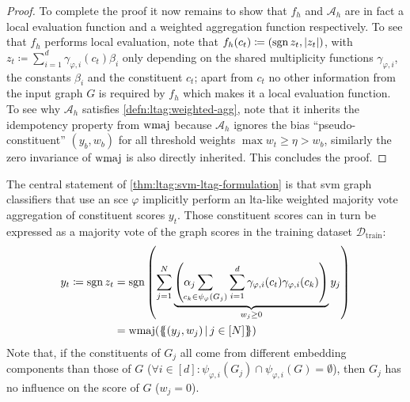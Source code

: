 \begin{proof}
	To complete the proof it now remains to show that $f_h$ and $\mathcal{A}_h$ are in fact a local evaluation function and a weighted aggregation function respectively.
	To see that $f_h$ performs local evaluation, note that $f_h(c_t) \coloneqq (\operatorname{sgn} z_t, {|z_t|})$, with $z_t \coloneqq \sum_{i=1}^{d} \gamma_{\varphi,i}(c_t) \beta_i$ only depending on the shared multiplicity functions $\gamma_{\varphi,i}$, the constants $\beta_i$ and the constituent $c_t$;
	apart from $c_t$ no other information from the input graph $G$ is required by $f_h$ which makes it a local evaluation function.
	To see why $\mathcal{A}_h$ satisfies \cref{defn:ltag:weighted-agg}, note that it inherits the idempotency property from $\operatorname{wmaj}$ because $\mathcal{A}_h$ ignores the bias ``pseudo-constituent'' $(y_b, w_b)$ for all threshold weights $\max w_t \geq \eta > w_b$, similarly the zero invariance of $\operatorname{wmaj}$ is also directly inherited.
	This concludes the proof.
\end{proof}

The central statement of \cref{thm:ltag:svm-ltag-formulation} is that \acs{svm} graph classifiers that use an \ac{sce} $\varphi$ implicitly perform an \acs{lta}-like weighted majority vote aggregation of constituent scores $y_t$.
Those constituent scores can in turn be expressed as a majority vote of the graph scores in the training dataset $\mathcal{D}_{\mathrm{train}}$:
\begin{align}
	y_t \coloneqq \sgn z_t
	 &= \sgn\left( \sum_{j=1}^N \underbrace{\left( \alpha_j \smashoperator[l]{\sum_{c_k \in \psi_{\varphi}(G_j)}} \sum_{i=1}^d \gamma_{\varphi,i}(c_t) \gamma_{\varphi,i}(c_k) \right)}_{w_j \geq 0} y_j \right) \\
	 &= \wmaj(\ldblbrace (y_j, w_j)\, |\, j \in [N] \rdblbrace) \nonumber
\end{align}
Note that, if the constituents of $G_j$ all come from different embedding components than those of $G$ ($\forall i \in [d]: {\psi_{\varphi, i}(G_j) \cap \psi_{\varphi, i}(G)} = \emptyset$), then $G_j$ has no influence on the score of $G$ ($w_j = 0$).

